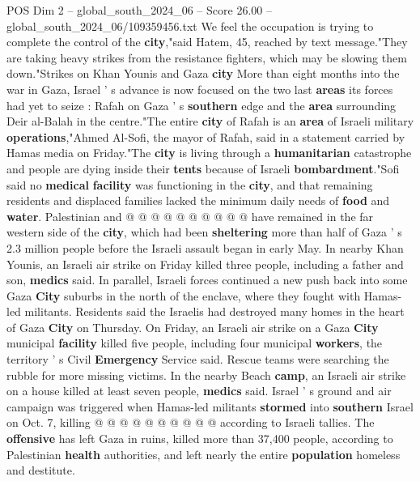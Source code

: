 \begin{textsample}{POS Dim 2 – global\_south\_2024\_06 – Score 26.00 – global\_south\_2024\_06/109359456.txt}
We feel the occupation is trying to complete the control of the \textbf{city},"said Hatem, 45, reached by text message."They are taking heavy strikes from the resistance fighters, which may be slowing them down."Strikes on Khan Younis and Gaza \textbf{city} More than eight months into the war in Gaza, Israel ' s advance is now focused on the two last \textbf{areas} its forces had yet to seize : Rafah on Gaza ' s \textbf{southern} edge and the \textbf{area} surrounding Deir al-Balah in the centre."The entire \textbf{city} of Rafah is an \textbf{area} of Israeli military \textbf{operations},"Ahmed Al-Sofi, the mayor of Rafah, said in a statement carried by Hamas media on Friday."The \textbf{city} is living through a \textbf{humanitarian} catastrophe and people are dying inside their \textbf{tents} because of Israeli \textbf{bombardment}."Sofi said no \textbf{medical} \textbf{facility} was functioning in the \textbf{city}, and that remaining residents and displaced families lacked the minimum daily needs of \textbf{food} and \textbf{water}.
Palestinian and @ @ @ @ @ @ @ @ @ @ have remained in the far western side of the \textbf{city}, which had been \textbf{sheltering} more than half of Gaza ' s 2.3 million people before the Israeli assault began in early May.
In nearby Khan Younis, an Israeli air strike on Friday killed three people, including a father and son, \textbf{medics} said.
In parallel, Israeli forces continued a new push back into some Gaza \textbf{City} suburbs in the north of the enclave, where they fought with Hamas-led militants.
Residents said the Israelis had destroyed many homes in the heart of Gaza \textbf{City} on Thursday.
On Friday, an Israeli air strike on a Gaza \textbf{City} municipal \textbf{facility} killed five people, including four municipal \textbf{workers}, the territory ' s Civil \textbf{Emergency} Service said.
Rescue teams were searching the rubble for more missing victims.
In the nearby Beach \textbf{camp}, an Israeli air strike on a house killed at least seven people, \textbf{medics} said.
Israel ' s ground and air campaign was triggered when Hamas-led militants \textbf{stormed} into \textbf{southern} Israel on Oct. 7, killing @ @ @ @ @ @ @ @ @ @ according to Israeli tallies.
The \textbf{offensive} has left Gaza in ruins, killed more than 37,400 people, according to Palestinian \textbf{health} authorities, and left nearly the entire \textbf{population} homeless and destitute.

\end{textsample}

